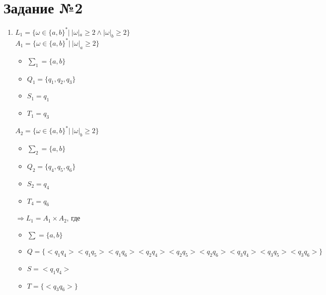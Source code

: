 \documentclass{article}
\begin{document}
\section*{\huge{Задание №2}}

    \begin{enumerate}
        \LARGE
        
        \item $ L_1 = \{ \omega \in \{a,b\}^*| \ |\omega|_a \geq 2 \land |\omega|_b \geq 2 \}$ \\ 
        
            $A_1 = \{ \omega \in \{a,b\}^*| \ |\omega|_a \geq 2 \}$

            \begin{center}
            \end{center}

            \begin{itemize}
                \item $\sum_1 = \{ a,b \}$ \\
                \item $Q_1 = \{ q_1, q_2, q_3 \} $ \\
                \item $S_1 = q_1$ \\
                \item$T_1 = q_3$
            \end{itemize}
            
            {$A_2 = \{ \omega \in \{a,b\}^*| \ |\omega|_b \geq 2 \} $}

            \begin{center}
            \end{center}
            
            \begin{itemize}
                \item $\sum_2 = \{ a,b \}$ \\
                \item $Q_2 = \{ q_4, q_5, q_6 \} $ \\
                \item $S_2 = q_4$ \\
                \item $T_4 = q_6$ \\
            \end{itemize}

            $\Rightarrow L_1 = A_1 \times A_2$, где
            \begin{itemize}
                \item $\sum = \{ a,b \}$ \\
                \item $Q = \{ <q_1q_4> <q_1q_5> <q_1q_6> <q_2q_4> <q_2q_5> <q_2q_6> <q_3q_4> <q_3q_5> <q_3q_6> \}$ \\
                \item $S = <q_1q_4>$ \\
                \item $T = \{<q_3q_6> \}$ \\
            \end{itemize}


\end{enumerate}
\end{document}

